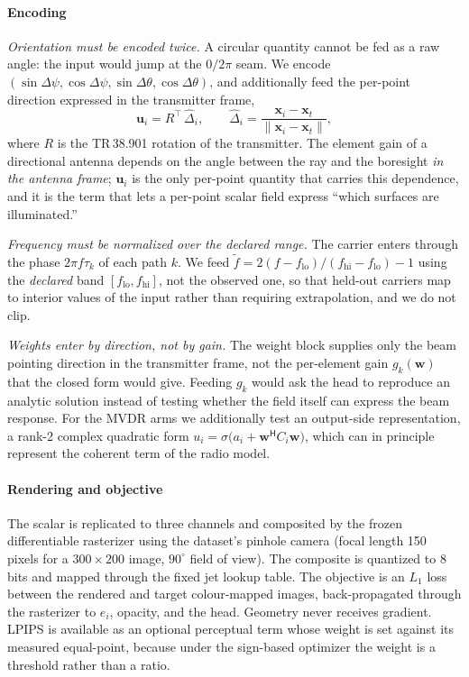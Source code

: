 \documentclass[conference]{IEEEtran}
\begin{document}
\paragraph{Encoding}
\emph{Orientation must be encoded twice.} A circular quantity cannot be fed as
a raw angle: the input would jump at the $0/2\pi$ seam. We encode
$(\sin\Delta\psi,\cos\Delta\psi,\sin\Delta\theta,\cos\Delta\theta)$, and
additionally feed the per-point direction expressed in the transmitter frame,
\begin{equation}
\mathbf{u}_i = R^{\top}\,\widehat{\Delta}_i,\qquad
\widehat{\Delta}_i=\frac{\mathbf{x}_i-\mathbf{x}_t}{\|\mathbf{x}_i-\mathbf{x}_t\|},
\end{equation}
where $R$ is the TR\,38.901 rotation of the transmitter. The element gain of a
directional antenna depends on the angle between the ray and the boresight
\emph{in the antenna frame}; $\mathbf{u}_i$ is the only per-point quantity that
carries this dependence, and it is the term that lets a per-point scalar field
express ``which surfaces are illuminated.''

\emph{Frequency must be normalized over the declared range.} The carrier enters
through the phase $2\pi f\tau_k$ of each path $k$. We feed
$\tilde f = 2(f-f_{\mathrm{lo}})/(f_{\mathrm{hi}}-f_{\mathrm{lo}})-1$ using the
\emph{declared} band $[f_{\mathrm{lo}},f_{\mathrm{hi}}]$, not the observed one,
so that held-out carriers map to interior values of the input rather than
requiring extrapolation, and we do not clip.

\emph{Weights enter by direction, not by gain.} The weight block supplies only
the beam pointing direction in the transmitter frame, not the per-element gain
$g_k(\mathbf{w})$ that the closed form would give. Feeding $g_k$ would ask the
head to reproduce an analytic solution instead of testing whether the field
itself can express the beam response. For the MVDR arms we additionally test an
output-side representation, a rank-2 complex quadratic form
$u_i=\sigma\bigl(a_i+\mathbf{w}^{\mathsf{H}}C_i\mathbf{w}\bigr)$, which can in
principle represent the coherent term of the radio model.

\paragraph{Rendering and objective}
The scalar is replicated to three channels and composited by the frozen
differentiable rasterizer using the dataset's pinhole camera (focal length 150
pixels for a $300\times200$ image, $90^\circ$ field of view). The composite is
quantized to 8 bits and mapped through the fixed jet lookup table. The
objective is an $L_1$ loss between the rendered and target colour-mapped
images, back-propagated through the rasterizer to $e_i$, opacity, and the head.
Geometry never receives gradient. LPIPS \cite{lpips} is available as an optional
perceptual term whose weight is set against its measured equal-point, because
under the sign-based optimizer the weight is a threshold rather than a ratio.
\end{document}

